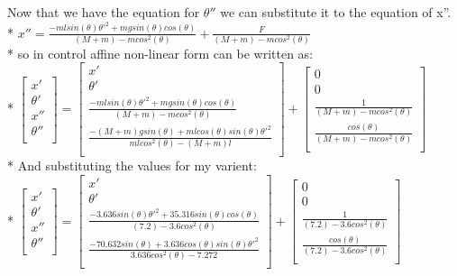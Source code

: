 \documentclass{article}
\begin{document}
Now that we have the equation for $\theta''$ we can substitute it to the equation of x''.\\*
$
\displaystyle
x''=\frac{-mlsin(\theta)\theta'^2+mgsin(\theta)cos(\theta)}{(M+m)-mcos^2(\theta)}+\frac{F}{(M+m)-mcos^2(\theta)}
$\\*
so in control affine non-linear form can be written as:\\*
$
\displaystyle
\begin{bmatrix}
x'\\
\theta'\\
x''\\
\theta''\\
\end{bmatrix}
=
\begin{bmatrix}
x'\\
\theta'\\
\frac{-mlsin(\theta)\theta'^2+mgsin(\theta)cos(\theta)}{(M+m)-mcos^2(\theta)}\\
\frac{-(M+m)gsin(\theta)+mlcos(\theta)sin(\theta)\theta'^2}{mlcos^2(\theta)-(M+m)l}\\
\end{bmatrix}
+
\begin{bmatrix}
0\\
0\\
\frac{1}{(M+m)-mcos^2(\theta)}\\
\frac{cos(\theta)}{(M+m)-mcos^2(\theta)}\\
\end{bmatrix}
$
\\*
And substituting the values for my varient:\\*
$
\displaystyle
\begin{bmatrix}
x'\\
\theta'\\
x''\\
\theta''\\
\end{bmatrix}
=
\begin{bmatrix}
x'\\
\theta'\\
\frac{-3.636sin(\theta)\theta'^2+35.316sin(\theta)cos(\theta)}{(7.2)-3.6cos^2(\theta)}\\
\frac{-70.632sin(\theta)+3.636cos(\theta)sin(\theta)\theta'^2}{3.636cos^2(\theta)-7.272}\\
\end{bmatrix}
+
\begin{bmatrix}
0\\
0\\
\frac{1}{(7.2)-3.6cos^2(\theta)}\\
\frac{cos(\theta)}{(7.2)-3.6cos^2(\theta)}\\
\end{bmatrix}
$
\end{document}

